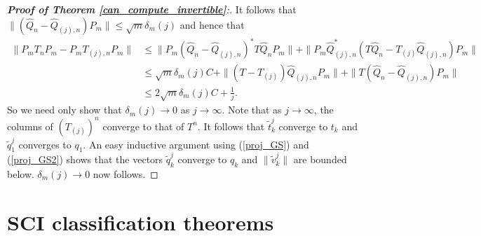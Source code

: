 \documentclass[a4paper,10pt]{article}
\begin{document}
\begin{proof}[\textbf{Proof of Theorem \ref{can_compute_invertible}}:]
It follows that $\|(\hat Q_n-\hat{Q}_{(j),n})P_m\|\leq \sqrt{m}\delta_m(j)$ and hence that
\begin{align*}
\|P_mT_nP_m-P_mT_{(j),n}P_m\|&\leq \|P_m(\hat Q_n-\hat{Q}_{(j),n})^*T \hat Q_nP_m\|+\|P_m\hat{Q}_{(j),n}^*(T\hat Q_n -T_{(j)}\hat{Q}_{(j),n})P_m\|\\
&\leq \sqrt{m}\delta_m(j)C +\|(T-T_{(j)})\hat Q_{(j),n}P_m\|+\|T(\hat Q_n-\hat{Q}_{(j),n})P_m\|\\
&\leq 2\sqrt{m}\delta_m(j)C+\frac{1}{j}.
\end{align*}
So we need only show that $\delta_m(j)\rightarrow 0$ as $j\rightarrow\infty$. Note that as $j\rightarrow\infty$, the columns of $(T_{(j)})^n$ converge to that of $T^n$. It follows that $\tilde t_k^j$ converge to $t_k$ and $\tilde q^j_1$ converges to $q_1$. An easy inductive argument using (\ref{proj_GS}) and (\ref{proj_GS2}) shows that the vectors $\tilde q_{k}^j$ converge to $q_{k}$ and $\|\tilde v_k^j\|$ are bounded below. $\delta_m(j)\rightarrow 0$ now follows.
\end{proof}

\section{SCI classification theorems}
\label{class_thms}
\end{document}
